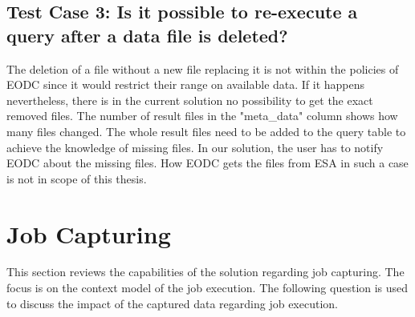 \documentclass[draft,final]{vutinfth} %
\begin{document}
\subsection{Test Case 3: Is it possible to re-execute a query after a data file is deleted?}
The deletion of a file without a new file replacing it is not within the policies of EODC since it would restrict their range on available data. If it happens nevertheless, there is in the current solution no possibility to get the exact removed files. The number of result files in the "meta\_data" column shows how many files changed. The whole result files need to be added to the query table to achieve the knowledge of missing files. In our solution, the user has to notify EODC about the missing files. How EODC gets the files from ESA in such a case is not in scope of this thesis.




\section{Job Capturing}\label{Evaluation:special_jobcap}

This section reviews the capabilities of the solution regarding job capturing. The focus is on the context model of the job execution. The following question is used to discuss the impact of the captured data regarding job execution. \\
\end{document}
